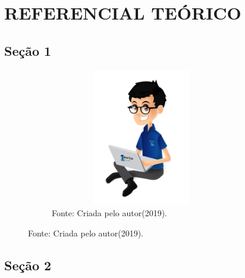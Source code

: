 \chapter{\uppercase{Referencial Teórico}}
\label{referencial}


\section{Seção 1}

 \lipsum[1-2]
 
 
\begin{figure}[h]
\centering
\captionsetup[subfigure]{labelformat=empty}
\caption{``Mascote H1''}
\begin{subfigure}{.5\textwidth}
\centering
\includegraphics[width=8cm,height=6cm]{Partes/Imagens/Mascote.png}
\caption{Fonte: Criada pelo autor(2019).}
\end{subfigure}%
\end{figure}
 
\section{Seção 2}
 
  \lipsum[1-9]